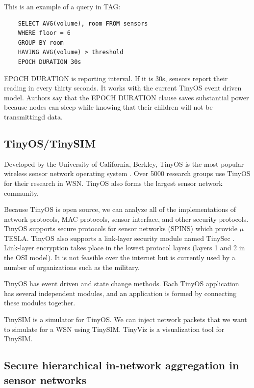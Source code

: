 \documentclass[a4paper]{article}
\begin{document}
This is an example of a query in TAG:

\begin{verbatim}
	SELECT AVG(volume), room FROM sensors
	WHERE floor = 6
	GROUP BY room
	HAVING AVG(volume) > threshold
	EPOCH DURATION 30s
\end{verbatim}

EPOCH DURATION is reporting interval. If it is 30s, sensors report their
reading in every thirty seconds. It works with the current TinyOS event driven
model. Authors say that the EPOCH DURATION clause saves substantial power
because nodes can sleep while knowing that their children will not be
transmittingd data.

\subsection{TinyOS/TinySIM}
Developed by the University of California, Berkley, TinyOS is the most popular
wireless sensor network operating system \cite{TinyOS}. Over 5000 research
groups use TinyOS for their research in WSN. TinyOS also forms the largest
sensor network community.

Because TinyOS is open source, we can analyze all of the implementations of
network protocols, MAC protocols, sensor interface, and other security
protocols.  TinyOS supports secure protocols for sensor networks (SPINS) which
provide $\mu$TESLA. TinyOS also supports a link-layer security module named
TinySec \cite{Karlof04}.  Link-layer encryption takes place in the lowest
protocol layers (layers 1 and 2 in the OSI model). It is not feasible over the
internet but is currently used by a number of organizations such as the
military.

TinyOS has event driven and state change methods. Each TinyOS application has
several independent modules, and an application is formed by connecting these
modules together.

TinySIM is a simulator for TinyOS. We can inject network packets that we want
to simulate for a WSN using TinySIM. TinyViz is a visualization tool for
TinySIM.

\subsection{Secure hierarchical in-network aggregation in sensor networks}
\end{document}
